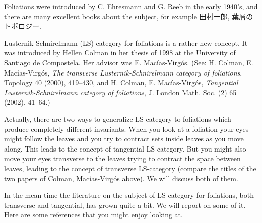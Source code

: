 \documentclass[uplatex,dvipdfmx]{jlreq}
\begin{document}
Foliations were introduced by C. Ehresmann and G. Reeb in the early 1940's, and there are many excellent books about the subject, for example 田村一郎, 葉層のトポロジー.

Lusternik-Schnirelmann (LS) category for foliations is a rather new concept. It was introduced by Hellen Colman in her thesis of 1998 at the University of Santiago de Compostela. Her advisor was E. Mac\'ias-Virg\'os. (See: H. Colman, E. Mac\'ias-Virg\'os, \textit{The transverse Lusternik-Schnirelmann category of foliations}, Topology 40 (2000), 419--430, and H. Colman, E. Mac\'ias-Virg\'os, \textit{Tangential Lusternik-Schnirelmann category of foliations}, J. London Math. Soc. (2) 65 (2002), 41--64.)

Actually, there are two ways to generalize LS-category to foliations which produce completely different invariants. When you look at a foliation your eyes might follow the leaves and you try to contract sets inside leaves as you move along. This leads to the concept of tangential LS-category. But you might also move your eyes transverse to the leaves trying to contract the space between leaves, leading to the concept of transverse LS-category (compare the titles of the two papers of Colman, Mac\'ias-Virg\'os above). We will discuss both of them.

In the mean time the literature on the subject of LS-category for foliations, both transverse and tangential, has grown quite a bit. We will report on some of it. Here are some references that you might enjoy looking at.
\end{document}
